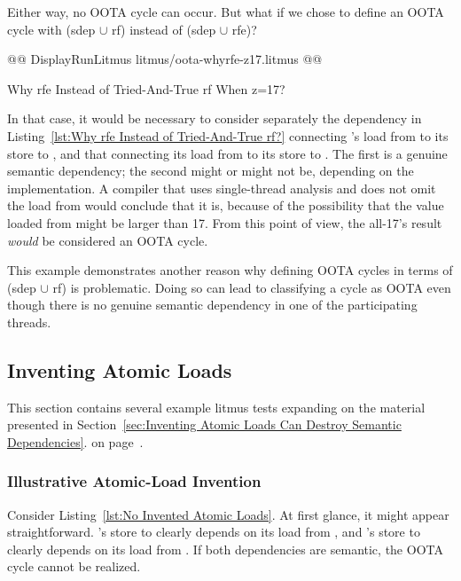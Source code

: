 \documentclass[10]{article}
\begin{document}
Either way, no OOTA cycle can occur.
But what if we chose to define an OOTA cycle with (sdep $\cup$ rf) instead
of (sdep $\cup$ rfe)?

\begin{listing}[tbp]
@@ DisplayRunLitmus litmus/oota-whyrfe-z17.litmus @@
\caption{Why rfe Instead of Tried-And-True rf When z=17?}
\label{lst:Why rfe Instead of Tried-And-True rf When z=17?}
\end{listing}

In that case, it would be necessary to consider separately the dependency
in Listing~\ref{lst:Why rfe Instead of Tried-And-True rf?}
connecting 's load from  to its store to ,
and that connecting its load from  to its store to .
The first is a genuine semantic dependency; the second might or might
not be, depending on the implementation.
A compiler that uses single-thread analysis and does not omit the load
from  would conclude that it is, because of the
possibility that the value loaded from  might be larger than 17.
From this point of view, the all-17's result \emph{would} be
considered an OOTA cycle.

This example demonstrates another reason why defining OOTA cycles
in terms of (sdep $\cup$ rf) is problematic.
Doing so can lead to classifying a cycle as OOTA even though there
is no genuine semantic dependency in one of the participating threads.

\subsection{Inventing Atomic Loads}
\label{app:Inventing Atomic Loads}

This section contains several example litmus tests
expanding on the material presented in
Section~\ref{sec:Inventing Atomic Loads Can Destroy Semantic Dependencies}.
on
page~\pageref{sec:Inventing Atomic Loads Can Destroy Semantic Dependencies}.

\subsubsection{Illustrative Atomic-Load Invention}
\label{app:Illustrative Atomic-Load Invention}

Consider Listing~\ref{lst:No Invented Atomic Loads}.
At first glance, it might appear straightforward.
's store to  clearly depends on its load from ,
and 's store to  clearly depends on its load from .
If both dependencies are semantic, the OOTA cycle cannot be realized.
\end{document}
